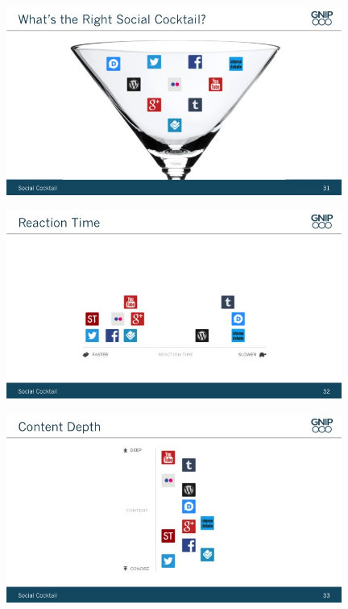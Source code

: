 \documentclass{beamer}
\begin{document}
\begin{frame}
  \begin{center}
    \includegraphics[width=11cm]{./imgs/Slide031.jpg}
  \end{center}
\end{frame}

\begin{frame}
  \begin{center}
    \includegraphics[width=11cm]{./imgs/Slide032.jpg}
  \end{center}
\end{frame}

\begin{frame}
  \begin{center}
    \includegraphics[width=11cm]{./imgs/Slide033.jpg}
  \end{center}
\end{frame}
\end{document}

